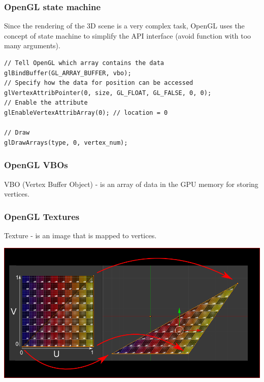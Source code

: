 \begin{frame}[fragile]

\frametitle{OpenGL state machine}

Since the rendering of the 3D scene is a very complex task, OpenGL uses
the concept of state machine to simplify the API interface (avoid function
with too many arguments).

\begin{center}
\begin{lstlisting}
// Tell OpenGL which array contains the data
glBindBuffer(GL_ARRAY_BUFFER, vbo);
// Specify how the data for position can be accessed
glVertexAttribPointer(0, size, GL_FLOAT, GL_FALSE, 0, 0);
// Enable the attribute
glEnableVertexAttribArray(0); // location = 0

// Draw
glDrawArrays(type, 0, vertex_num);
\end{lstlisting}
\end{center}

\end{frame}

\begin{frame}[fragile]

\frametitle{OpenGL VBOs}

VBO (Vertex Buffer Object) - is an array of data in the GPU memory for storing vertices.

\end{frame}

\begin{frame}[fragile]

\frametitle{OpenGL Textures}

Texture - is an image that is mapped to vertices.

\begin{center}
\includegraphics[width=\textwidth]{images/uv.png}
\end{center}

\end{frame}

